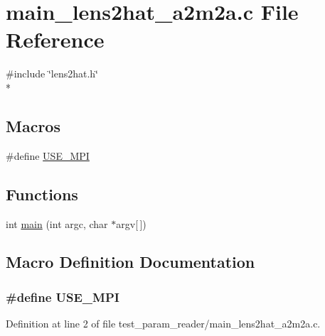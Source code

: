 \section{main\-\_\-lens2hat\-\_\-a2m2a.\-c File Reference}
\label{test__param__reader_2main__lens2hat__a2m2a_8c}
{\ttfamily \#include \char`\"{}lens2hat.\-h\char`\"{}}\\*
\subsection*{Macros}
\begin{DoxyCompactItemize}
\item 
\#define \hyperlink{test__param__reader_2main__lens2hat__a2m2a_8c_a3869d282031f6ea6b50fdb980b758420}{U\-S\-E\-\_\-\-M\-P\-I}
\end{DoxyCompactItemize}
\subsection*{Functions}
\begin{DoxyCompactItemize}
\item 
int \hyperlink{test__param__reader_2main__lens2hat__a2m2a_8c_a0ddf1224851353fc92bfbff6f499fa97}{main} (int argc, char $\ast$argv\mbox{[}$\,$\mbox{]})
\end{DoxyCompactItemize}


\subsection{Macro Definition Documentation}
\subsubsection[{U\-S\-E\-\_\-\-M\-P\-I}]{\setlength{\rightskip}{0pt plus 5cm}\#define U\-S\-E\-\_\-\-M\-P\-I}\label{test__param__reader_2main__lens2hat__a2m2a_8c_a3869d282031f6ea6b50fdb980b758420}


Definition at line 2 of file test\-\_\-param\-\_\-reader/main\-\_\-lens2hat\-\_\-a2m2a.\-c.



